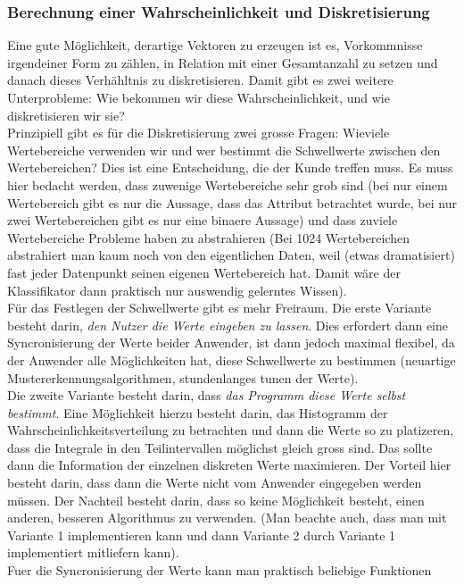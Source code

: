 \documentclass{article}
\theoremstyle{definition}
\theoremstyle{remark}
\begin{document}
\subsubsection{Berechnung einer Wahrscheinlichkeit und Diskretisierung}
Eine gute M\"oglichkeit, derartige Vektoren zu erzeugen ist es, Vorkommnisse
irgendeiner Form zu z\"ahlen, in Relation mit einer Gesamtanzahl zu setzen und 
danach dieses Verh\"ahltnis zu diskretisieren. Damit gibt es zwei weitere 
Unterprobleme: Wie bekommen wir diese Wahrscheinlichkeit, und wie diskretisieren
wir sie?\\
Prinzipiell gibt es f\"ur die Diskretisierung zwei grosse Fragen: Wieviele 
Wertebereiche verwenden wir und wer bestimmt die Schwellwerte zwischen den
Wertebereichen? Dies ist eine Entscheidung, die der Kunde treffen muss. Es muss
hier bedacht werden, dass zuwenige Wertebereiche sehr grob sind (bei 
nur einem Wertebereich gibt es nur die Aussage, dass das Attribut betrachtet
wurde, bei nur zwei Wertebereichen gibt es nur eine binaere Aussage) und dass
zuviele Wertebereiche Probleme haben zu abstrahieren (Bei
1024 Wertebereichen abstrahiert man kaum noch von den eigentlichen
Daten, weil (etwas dramatisiert) fast jeder Datenpunkt seinen 
eigenen Wertebereich hat. Damit w\"are der Klassifikator dann praktisch
nur auswendig gelerntes Wissen).\\
F\"ur das Festlegen der Schwellwerte gibt es mehr Freiraum. Die erste Variante
besteht darin, {\em den Nutzer die Werte eingeben zu lassen}. Dies erfordert dann
eine Syncronisierung der Werte beider Anwender, ist dann jedoch maximal
flexibel, da der Anwender alle M\"oglichkeiten hat, diese Schwellwerte zu 
bestimmen (neuartige Mustererkennungsalgorithmen, stundenlanges tunen der
Werte).\\
Die zweite Variante besteht darin, dass {\em das Programm diese Werte selbst 
bestimmt}. Eine M\"oglichkeit hierzu besteht darin, das Histogramm der 
Wahrscheinlichkeitsverteilung zu betrachten und dann die Werte so zu platizeren,
dass die Integrale in den Teilintervallen m\"oglichst gleich gross sind. Das
sollte dann die Information der einzelnen diskreten Werte maximieren. Der
Vorteil hier besteht darin, dass dann die Werte nicht vom Anwender eingegeben
werden m\"ussen. Der Nachteil besteht darin, dass so keine M\"oglichkeit besteht,
einen anderen, besseren Algorithmus zu verwenden. (Man beachte auch, dass man
mit Variante 1 implementieren kann und dann Variante 2 durch Variante 1
implementiert mitliefern kann).\\
Fuer die Syncronisierung der Werte kann man praktisch beliebige Funktionen
\end{document}
